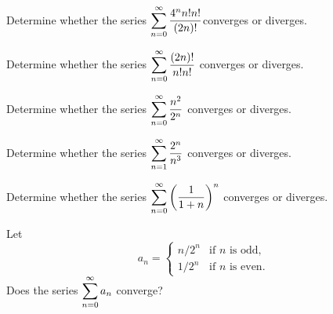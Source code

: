\begin{example}
Determine whether the series  $\displaystyle\sum_{n=0}^\infty\frac{4^nn!n!}{(2n)!}$converges or diverges.
\end{example}

\newpage


\begin{example}
Determine whether the series $\displaystyle\sum_{n=0}^\infty\frac{(2n)!}{n!n!}$ converges or diverges.
\end{example}

\newpage


\begin{example}
Determine whether the series $\displaystyle\sum_{n=0}^\infty\frac{n^2}{2^n}$ converges or diverges.
\end{example}

\newpage

\begin{example}
Determine whether the series $\displaystyle\sum_{n=1}^\infty\frac{2^n}{n^3}$ converges or diverges.
\end{example}

\newpage

\begin{example}
Determine whether the series $\displaystyle\sum_{n=0}^\infty\left(\frac{1}{1+n}\right)^n$ converges or diverges.
\end{example}

\newpage

\begin{example}
Let
\begin{equation*}
a_n = \begin{cases}
n/2^n & \text{if } n \text{ is odd},\\
1/2^n & \text{if } n \text{ is even}.
\end{cases}
\end{equation*}
Does the series $\displaystyle\sum_{n=0}^\infty a_n$ converge?
\end{example}
